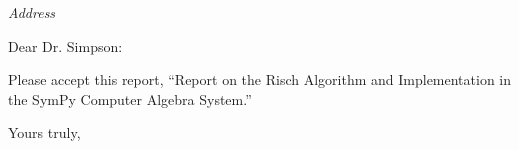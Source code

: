 \documentclass{letter}
\begin{document}
\begin{letter}{\emph{Address}}
\opening{Dear Dr. Simpson:}


Please accept this report, ``Report  on the Risch Algorithm and Implementation
in the SymPy Computer Algebra System.''  

\closing{Yours truly,}
\end{letter}
\end{document}
